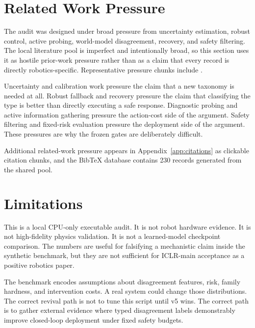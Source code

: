\documentclass[11pt]{article}
\begin{document}
\begin{table}[H]
\centering
\caption{Representative failure cases.}
\label{tab:negative}
\resizebox{\linewidth}{!}{}
\end{table}

\section{Related Work Pressure}
The audit was designed under broad pressure from uncertainty estimation, robust control, active probing, world-model disagreement, recovery, and safety filtering. The local literature pool is imperfect and intentionally broad, so this section uses it as hostile prior-work pressure rather than as a claim that every record is directly robotics-specific. Representative pressure chunks include \citep{tsekhmystro2019mobile19,hu2022remaining20,zeiger2009mobile21} \citep{andrews2021insights22,tsiklaurindevaluating23,gugulothu2020predicting24} \citep{ting2021on25,goulao2024training26,yu2024remaining27} \citep{cash2020salience28,ozsundbuilding29,chukwurah2024simtoreal30}.

Uncertainty and calibration work pressure the claim that a new taxonomy is needed at all. Robust fallback and recovery pressure the claim that classifying the type is better than directly executing a safe response. Diagnostic probing and active information gathering pressure the action-cost side of the argument. Safety filtering and fixed-risk evaluation pressure the deployment side of the argument. These pressures are why the frozen gates are deliberately difficult.

Additional related-work pressure appears in Appendix~\ref{app:citations} as clickable citation chunks, and the BibTeX database contains 230 records generated from the shared pool.

\section{Limitations}
This is a local CPU-only executable audit. It is not robot hardware evidence. It is not high-fidelity physics validation. It is not a learned-model checkpoint comparison. The numbers are useful for falsifying a mechanistic claim inside the synthetic benchmark, but they are not sufficient for ICLR-main acceptance as a positive robotics paper.

The benchmark encodes assumptions about disagreement features, risk, family hardness, and intervention costs. A real system could change those distributions. The correct revival path is not to tune this script until v5 wins. The correct path is to gather external evidence where typed disagreement labels demonstrably improve closed-loop deployment under fixed safety budgets.
\end{document}

